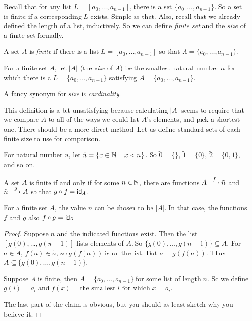 Recall that for any list $L = [a_0,\ldots, a_{n-1}]$, there is a set $\{a_0,\ldots, a_{n-1}\}$. So a set is finite if a corresponding $L$ exists. Simple as that. Also, recall that we already defined the length of a list, inductively. So we can define \emph{finite set} and the \emph{size} of a finite set formally.

\begin{defn}
	A set $A$ is \emph{finite} if there is a list $L=[a_0,\dotsc, a_{n-1}]$ so that $A = \{a_0,\dotsc, a_{n-1}\}$.
	
	For a finite set $A$, let $|A|$ (the \emph{size} of $A$) be the smallest natural number $n$ for which there is a $L=\{a_0,\dotsc,a_{n-1}\}$ satisfying $A = \{a_0,\dotsc, a_{n-1}\}$. 
	
	A fancy synonym for \emph{size} is \emph{cardinality}.  
\end{defn}
 
This definition is a bit unsatisfying because calculating $|A|$ seems to require that we compare $A$ to all of the ways we could list $A$'s elements, and pick a shortest one. There should be a more direct method.
Let us define standard sets of each finite size to use for comparison.

\begin{defn}
	For natural number $n$, let $\tilde n = \{x\in \NN\st x<n\}$.
	So $\tilde 0 = \{\}$, $\tilde 1 = \{0\}$, $\tilde 2 = \{0,1\}$, and so on.
\end{defn}

\begin{lemma}
	A set $A$ is finite if and only if for some $n\in\NN$, there are functions $\sfromto fA{\tilde n}$ and $\sfromto g{\tilde n}A$ so that $g\circ f = \id_A$. 
	
	For a finite set $A$, the value $n$ can be chosen to be $|A|$. In that case, the functions $f$ and $g$ also $f\circ g=\id_{\tilde n}$
	
	\begin{proof}
		Suppose $n$ and the indicated functions exist. Then the list $[g(0),\dotsc,g(n-1)]$ lists elements of $A$. So
		$\{g(0),\dotsc,g(n-1)\}\subseteq A$. For $a\in A$, $f(a)\in \tilde n$, so $g(f(a))$ is on the list. But $a=g(f(a))$. Thus
		$A\subseteq \{g(0),\dotsc,g(n-1)\}$.
		
		Suppose $A$ is finite, then $A = \{a_0,\dotsc,a_{n-1}\}$
		for some list of length $n$. So we define $g(i) = a_i$
		and $f(x) = \text{the smallest $i$ for which $x = a_i$}$.
		
		The last part of the claim is obvious, but you should at least sketch why you believe it.
	\end{proof}
\end{lemma}


